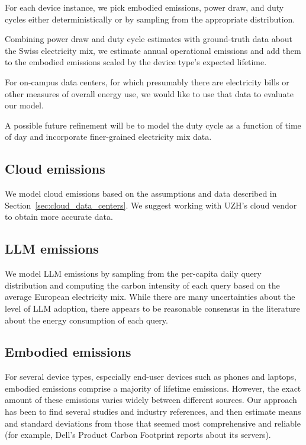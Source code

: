 \documentclass[11pt]{article}
\begin{document}
For each device instance, we pick embodied emissions, power draw, and duty cycles either
deterministically or by sampling from the appropriate distribution.

Combining power draw and duty cycle estimates with ground-truth data about the Swiss electricity mix,
we estimate annual operational emissions and add them to the embodied emissions scaled by the device
type's expected lifetime.

For on-campus data centers, for which presumably there are electricity bills or other measures of
overall energy use, we would like to use that data to evaluate our model.

A possible future refinement will be to model the duty cycle as a function of time of day
and incorporate finer-grained electricity mix data.

\subsection{Cloud emissions}

We model cloud emissions based on the assumptions and data described in
Section~\ref{sec:cloud_data_centers}. We suggest working with UZH's cloud vendor to obtain
more accurate data.

\subsection{LLM emissions}

We model LLM emissions by sampling from the per-capita daily query distribution and computing
the carbon intensity of each query based on the average European electricity mix. While there
are many uncertainties about the level of LLM adoption, there appears to be reasonable consensus
in the literature about the energy consumption of each query.

\subsection{Embodied emissions}

For several device types, especially end-user devices such as phones and laptops, embodied emissions
comprise a majority of lifetime emissions. However, the exact amount of these emissions varies
widely between different sources. Our approach has been to find several studies and industry references,
and then estimate means and standard deviations from those that seemed most comprehensive and reliable
(for example, Dell's Product Carbon Footprint reports about its servers).
\end{document}
